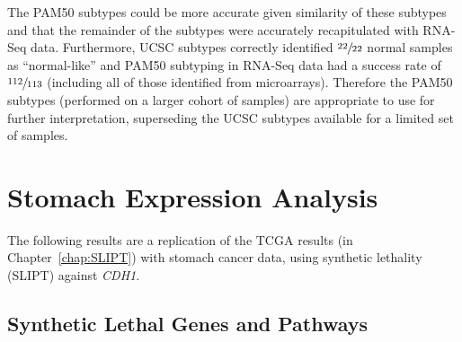The \gls{PAM50} subtypes could be more accurate given similarity of these subtypes and that the remainder of the subtypes were accurately recapitulated with \gls{RNA-Seq} data. Furthermore, \gls{UCSC} subtypes correctly identified $\sfrac{22}{22}$ normal samples as ``normal-like'' and \gls{PAM50} subtyping in \gls{RNA-Seq} data had a success rate of $\sfrac{112}{113}$ (including all of those identified from microarrays). Therefore the \gls{PAM50} subtypes (performed on a larger cohort of samples) are appropriate to use for further interpretation, superseding the \gls{UCSC} subtypes available for a limited set of samples.


\FloatBarrier

\iffalse
\chapter{Stomach Expression Analysis}
\label{appendix:stad_exprSL}

The following results are a replication of the \gls{TCGA} results (in Chapter~\ref{chap:SLIPT}) with stomach cancer data, using synthetic lethality (SLIPT) against \textit{CDH1}.

\section{Synthetic Lethal Genes and Pathways} \label{appendix:stad_exprSL_genes}

